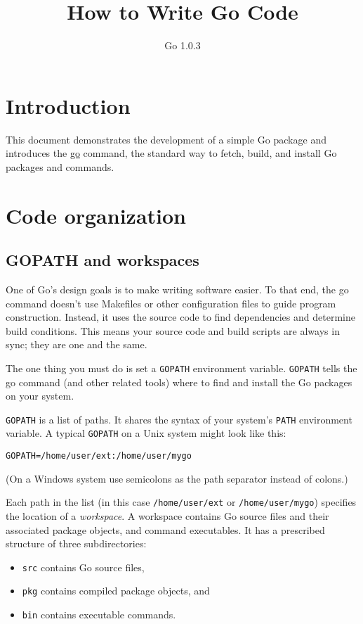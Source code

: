 \documentclass[UTF-8]{article}
\title{How to Write Go Code}
\author{Go 1.0.3}
\begin{document}
\maketitle

\section *{Introduction}
This document demonstrates the development of a simple Go package
and introduces the \href{http://golang.org/cmd/go/}{go} command,
the standard way to fetch, build, and install Go packages and
commands.

\section*{Code organization}
\subsection*{GOPATH and workspaces}

One of Go's design goals is to make writing software easier. To
that end, the go command doesn't use Makefiles or other configuration
files to guide program construction. Instead, it uses the source
code to find dependencies and determine build conditions. This means
your source code and build scripts are always in sync; they are one
and the same.

The one thing you must do is set a \verb|GOPATH| environment variable.
\verb|GOPATH| tells the go command (and other related tools) where to find
and install the Go packages on your system.

\verb|GOPATH| is a list of paths. It shares the syntax of your
system's \verb|PATH| environment variable. A typical \verb|GOPATH|
on a Unix system might look like this:

\begin{Verbatim}[frame=single]
GOPATH=/home/user/ext:/home/user/mygo
\end{Verbatim}

(On a Windows system use semicolons as the path separator instead of colons.)

Each path in the list (in this case \verb|/home/user/ext| or
\verb|/home/user/mygo|) specifies the location of a \textit{workspace}.
A workspace contains Go source files and their associated package
objects, and command executables. It has a prescribed structure of
three subdirectories:

\begin{itemize}
  \item \verb|src| contains Go source files,
  \item \verb|pkg| contains compiled package objects, and
  \item \verb|bin| contains executable commands.
\end{itemize}
\end{document}

